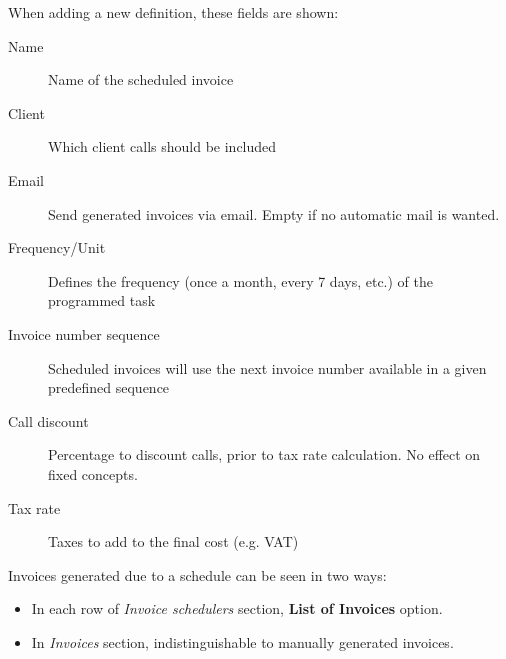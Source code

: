 \documentclass[letterpaper,10pt,english]{sphinxmanual}
\begin{document}
When adding a new definition, these fields are shown:
\begin{description}
\item[{Name}] \leavevmode{}\label{administration_portal/brand/invoicing/invoice_schedulers:term-name}
Name of the scheduled invoice

\item[{Client}] \leavevmode{}\label{administration_portal/brand/invoicing/invoice_schedulers:term-client}
Which client calls should be included

\item[{Email}] \leavevmode{}\label{administration_portal/brand/invoicing/invoice_schedulers:term-email}
Send generated invoices via email. Empty if no automatic mail is wanted.

\item[{Frequency/Unit}] \leavevmode{}\label{administration_portal/brand/invoicing/invoice_schedulers:term-frequency-unit}
Defines the frequency (once a month, every 7 days, etc.) of the programmed task

\item[{Invoice number sequence}] \leavevmode{}\label{administration_portal/brand/invoicing/invoice_schedulers:term-invoice-number-sequence}
Scheduled invoices will use the next invoice number available in a given predefined sequence

\item[{Call discount}] \leavevmode{}\label{administration_portal/brand/invoicing/invoice_schedulers:term-call-discount}
Percentage to discount calls, prior to tax rate calculation. No effect on fixed concepts.

\item[{Tax rate}] \leavevmode{}\label{administration_portal/brand/invoicing/invoice_schedulers:term-tax-rate}
Taxes to add to the final cost (e.g. VAT)

\end{description}

Invoices generated due to a schedule can be seen in two ways:
\begin{itemize}
\item {} 
In each row of \emph{Invoice schedulers} section, \textbf{List of Invoices} option.

\item {} 
In \emph{Invoices} section, indistinguishable to manually generated invoices.

\end{itemize}
\end{document}
